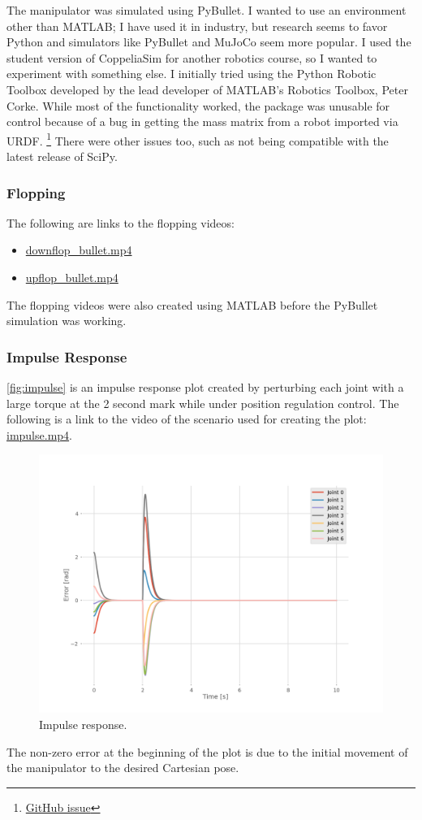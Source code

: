 \documentclass{article}
\begin{document}
The manipulator was simulated using PyBullet.
I wanted to use an environment other than MATLAB;
I have used it in industry, but research seems to favor Python and simulators like PyBullet and MuJoCo seem more popular.
I used the student version of CoppeliaSim for another robotics course,
so I wanted to experiment with something else.
I initially tried using the Python Robotic Toolbox developed by the lead developer of MATLAB's Robotics Toolbox,
Peter Corke.
While most of the functionality worked,
the package was unusable for control because of a bug in getting the mass matrix from a robot imported via URDF.
\footnote{\href{https://github.com/petercorke/robotics-toolbox-python/issues/368}{GitHub issue}}
There were other issues too, such as not being compatible with the latest release of SciPy.

\subsubsection{Flopping}

The following are links to the flopping videos:
\begin{itemize}
  \item \href{./media/downflop_bullet.mp4}{downflop\_bullet.mp4}
  \item \href{./media/upflop_bullet.mp4}{upflop\_bullet.mp4}
\end{itemize}
The flopping videos were also created using MATLAB before the PyBullet simulation was working.

\subsubsection{Impulse Response}

\autoref{fig:impulse} is an impulse response plot created by perturbing each joint with a large torque at the 2 second
mark while under position regulation control.
The following is a link to the video of the scenario used for creating the plot: \href{./media/impulse.mp4}{impulse.mp4}.
\begin{figure}[h]
  \centering
  \includegraphics[width=0.75\linewidth]{media/impulse}
  \caption{Impulse response.}
  \label{fig:impulse}
\end{figure}
The non-zero error at the beginning of the plot is due to the initial movement of the manipulator to the desired
Cartesian pose.
\end{document}
